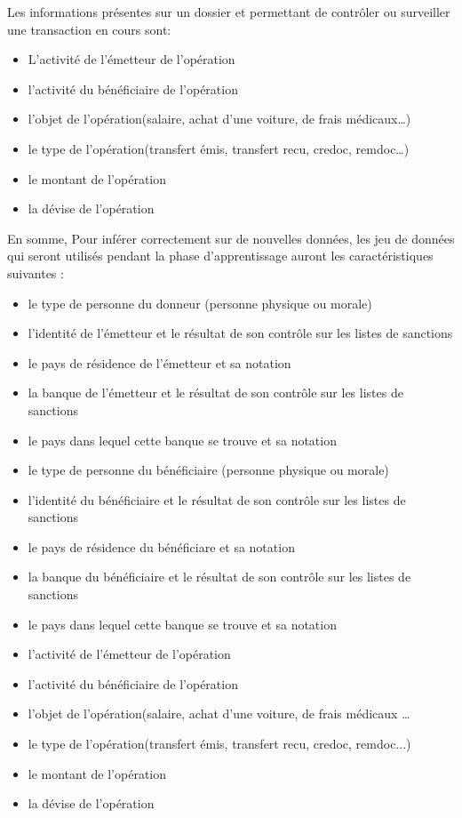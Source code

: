 Les informations présentes sur un dossier et permettant de contrôler ou
surveiller une transaction en cours sont:
\begin{itemize}
  \item L'activité de l'émetteur de l'opération
  \item l'activité du bénéficiaire de l'opération
  \item l'objet de l'opération(salaire, achat d'une voiture, de frais
    médicaux\ldots)
  \item le type de l'opération(transfert émis, transfert recu,  credoc,
    remdoc\ldots)
  \item le montant de l'opération
  \item la dévise de l'opération
\end{itemize}

En somme, Pour inférer correctement sur de nouvelles données, les jeu de
données qui seront utilisés pendant la phase d'apprentissage auront les
caractéristiques suivantes :

\begin{itemize}
  \item le type de personne du donneur (personne physique ou morale)
 \item l'identité de l'émetteur et le résultat de son contrôle sur les
   listes de sanctions
 \item le pays de résidence de l'émetteur et sa notation
 \item la banque de l'émetteur et le résultat de son contrôle sur les
   listes de sanctions
 \item le pays dans lequel cette banque se trouve et sa notation
 \item le type de personne du bénéficiaire (personne physique ou morale)
 \item l'identité du bénéficiaire et le résultat de son contrôle sur les
   listes de sanctions
 \item le pays de résidence du bénéficiare et sa notation
 \item la banque du bénéficiaire et le résultat de son contrôle sur les
   listes de sanctions
 \item le pays dans lequel cette banque se trouve et sa notation
 \item l'activité de l'émetteur de l'opération
 \item l'activité du bénéficiaire de l'opération
 \item l'objet de l'opération(salaire, achat d'une voiture, de frais
    médicaux \ldots
 \item le type de l'opération(transfert émis, transfert recu,  credoc,
    remdoc...)
 \item le montant de l'opération
 \item la dévise de l'opération
\end{itemize}

